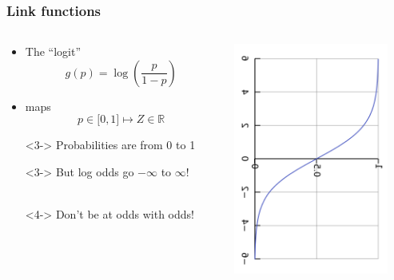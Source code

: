 \documentclass[xcolor={dvipsnames}]{beamer}
\begin{document}
\frame
{
\frametitle{Link functions}

\begin{columns}
\begin{column}{.5\textwidth}
\begin{itemize}
\item The ``logit''  
$$g(p) = \log\left(\frac{p}{1-p}\right)$$
\item<2->  maps 
$$p \in {[}0,1{]} \mapsto Z \in \mathbb{R}$$
\item[]<3-> Probabilities are from 0 to 1 
\item[]<3-> But log odds go $-\infty$ to $\infty$! \\${}$
\item[]<4-> Don't be at odds with odds!
\end{itemize}
\end{column}
\begin{column}{.5\textwidth}
\includegraphics[width=2in]{stuff/Logistic-curve2.png}
\end{column}
\end{columns}
}
\end{document}
